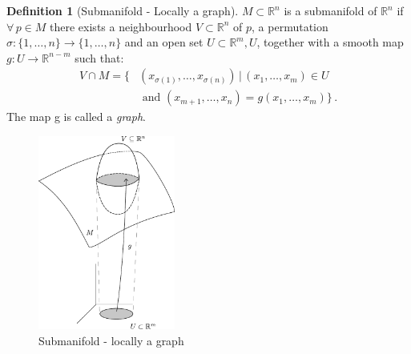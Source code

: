 \documentclass[a4paper,11pt,titlepage, article, oneside]{memoir}
\numberwithin{equation}{section}
\theoremstyle{definition}
\newtheorem{definition}[theorem]{Definition}
\theoremstyle{remark}
\newcommand{\rfield}{\mathbb{R}}
\begin{document}
\begin{definition}[Submanifold - Locally a graph] \label{sub4}
  $M \subset \rfield^n$ is a submanifold of $\rfield^n$ if $\forall \, p \in M$ there exists a neighbourhood $V \subset \rfield^n$ of $p$, a permutation $\sigma \colon \{1, \ldots, n\} \rightarrow \{1, \ldots, n\}$ and an open set $U \subset \rfield^m, U$, together with a smooth map $g \colon U \rightarrow \rfield^{n-m}$ such that:
  \begin{align*}
  V \cap M = \{ &(x_{\sigma(1)}, \ldots, x_{\sigma(n)}) \, |\, (x_1, \ldots, x_m) \in U \\
   &\text{ and } (x_{m+1}, \ldots, x_n) = g(x_1, \ldots, x_m)\} \, .
\end{align*}
  The map g is called a \textit{graph}.
  \begin{figure}[H]
  \label{Fig:submanifold4}
     \centering
     \includegraphics[width=0.4\textwidth]{Images/submanifold4.pdf} 
     \caption{Submanifold - locally a graph}      
\end{figure}
\end{definition}
\end{document}
